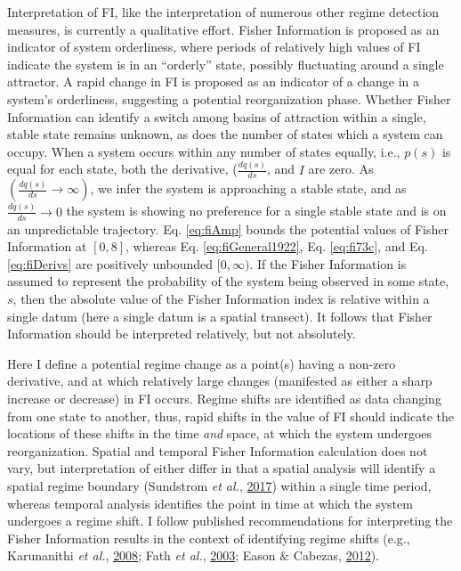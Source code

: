 \documentclass[print]{nuthesis}
\begin{document}
Interpretation of FI, like the interpretation of numerous other regime detection measures, is currently a qualitative effort. Fisher Information is proposed as an indicator of system orderliness, where periods of relatively high values of FI indicate the system is in an ``orderly'' state, possibly fluctuating around a single attractor. A rapid change in FI is proposed as an indicator of a change in a system's orderliness, suggesting a potential reorganization phase. Whether Fisher Information can identify a switch among basins of attraction within a single, stable state remains unknown, as does the number of states which a system can occupy. When a system occurs within any number of states equally, i.e., \(p(s)\) is equal for each state, both the derivative, (\(\frac{dq(s)}{ds}\), and \(I\) are zero. As \((\frac{dq(s)}{ds} \rightarrow \infty)\), we infer the system is approaching a stable state, and as \(\frac{dq(s)}{ds} \rightarrow 0\) the system is showing no preference for a single stable state and is on an unpredictable trajectory. Eq. \eqref{eq:fiAmp} bounds the potential values of Fisher Information at \([0, 8]\), whereas Eq. \eqref{eq:fiGeneral1922}, Eq. \eqref{eq:fi73c}, and Eq. \eqref{eq:fiDerivs} are positively unbounded \([0, \infty)\). If the Fisher Information is assumed to represent the probability of the system being observed in some state, \(s\), then the absolute value of the Fisher Information index is relative within a single datum (here a single datum is a spatial transect). It follows that Fisher Information should be interpreted relatively, but not absolutely.

Here I define a potential regime change as a point(s) having a non-zero derivative, and at which relatively large changes (manifested as either a sharp increase or decrease) in FI occurs. Regime shifts are identified as data changing from one state to another, thus, rapid shifts in the value of FI should indicate the locations of these shifts in the time \emph{and} space, at which the system undergoes reorganization. Spatial and temporal Fisher Information calculation does not vary, but interpretation of either differ in that a spatial analysis will identify a spatial regime boundary (Sundstrom \emph{et al.}, \protect\hyperlink{ref-sundstrom2017detecting}{2017}) within a single time period, whereas temporal analysis identifies the point in time at which the system undergoes a regime shift. I follow published recommendations for interpreting the Fisher Information results in the context of identifying regime shifts (e.g., Karunanithi \emph{et al.}, \protect\hyperlink{ref-karunanithi_detection_2008}{2008}; Fath \emph{et al.}, \protect\hyperlink{ref-fath_regime_2003}{2003}; Eason \& Cabezas, \protect\hyperlink{ref-eason_evaluating_2012}{2012}).
\end{document}
